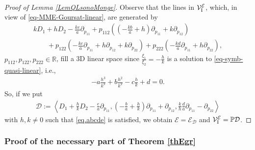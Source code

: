 \documentclass[pdftex]{sigma}
\newcommand{\D}{\mathcal{D}}
\newcommand{\MM}{\mathcal{V}_{\textrm{\normalfont I}}}
\newcommand{\E}{\mathcal{E}}
\newcommand{\Span}[1]{\left\langle #1 \right\rangle}
\renewcommand{\P}{\mathbb{P}}
\numberwithin{equation}{section}
\begin{document}
\begin{proof}[Proof of Lemma \ref{LemQLsonoMonge}]
Observe that the lines in $\MM^\E$, which, in view of \eqref{eq-MME-Goursat-linear}, are generated by
\begin{gather*}
 kD_1+hD_2-\frac{ke}{a}\partial_{p_{11}}+
p_{112}\left(\left(-\frac{kb}{a}+h\right)\partial_{p_{11}}+k\partial_{p_{12}}\right) \\
\qquad {} + p_{122}\left(-\frac{kc}{a}\partial_{p_{11}}+h\partial_{p_{12}}+k\partial_{p_{22}}\right)
+p_{222}\left(-\frac{kd}{a}\partial_{p_{11}}+h\partial_{p_{22}}\right),
\end{gather*}
$p_{112},p_{122},p_{222}\in\mathbb{R}$,
f\/ill a 3D linear space since $\frac{\xi_1}{\xi_2}=-\frac{h}{k}$ is a solution to \eqref{eq-symb-quasi-linear}, i.e.,
\begin{gather}\label{eq.abcde}
-a\frac{h^3}{k^3}+b\frac{h^2}{k^2}-c\frac{h}{k}+d=0.
\end{gather}
So, if we put
\begin{gather*}%
\D:= \Span{ D_1 + \frac{h}{k}D_2 - \frac{e}{a}\partial_{p_{11}}, \left(-\frac{b}{a}+\frac{h}{k}\right)\partial_{p_{11}}+\partial_{p_{12}}, \frac{k}{h}\frac{d}{a}\partial_{p_{11}}-\partial_{p_{22}}}
\end{gather*}
with $h,k\neq 0$ such that \eqref{eq.abcde} is satisf\/ied, we obtain $\E=\E_\D$ and $\MM^\E=\P\D$.
\end{proof}

\subsubsection{Proof of the necessary part of Theorem \ref{thEgr}}\label{subDimThEgrNec}
\end{document}
